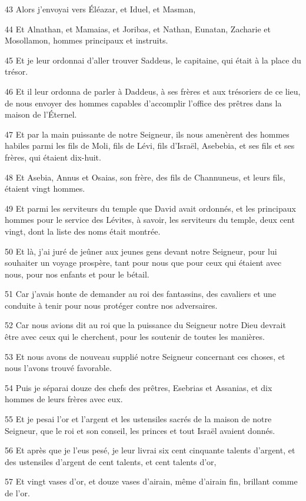 \par 43 Alors j'envoyai vers Éléazar, et Iduel, et Masman,
\par 44 Et Alnathan, et Mamaias, et Joribas, et Nathan, Eunatan, Zacharie et Mosollamon, hommes principaux et instruits.
\par 45 Et je leur ordonnai d'aller trouver Saddeus, le capitaine, qui était à la place du trésor.
\par 46 Et il leur ordonna de parler à Daddeus, à ses frères et aux trésoriers de ce lieu, de nous envoyer des hommes capables d'accomplir l'office des prêtres dans la maison de l'Éternel.
\par 47 Et par la main puissante de notre Seigneur, ils nous amenèrent des hommes habiles parmi les fils de Moli, fils de Lévi, fils d'Israël, Asebebia, et ses fils et ses frères, qui étaient dix-huit.
\par 48 Et Asebia, Annus et Osaias, son frère, des fils de Channuneus, et leurs fils, étaient vingt hommes.
\par 49 Et parmi les serviteurs du temple que David avait ordonnés, et les principaux hommes pour le service des Lévites, à savoir, les serviteurs du temple, deux cent vingt, dont la liste des noms était montrée.
\par 50 Et là, j'ai juré de jeûner aux jeunes gens devant notre Seigneur, pour lui souhaiter un voyage prospère, tant pour nous que pour ceux qui étaient avec nous, pour nos enfants et pour le bétail.
\par 51 Car j'avais honte de demander au roi des fantassins, des cavaliers et une conduite à tenir pour nous protéger contre nos adversaires.
\par 52 Car nous avions dit au roi que la puissance du Seigneur notre Dieu devrait être avec ceux qui le cherchent, pour les soutenir de toutes les manières.
\par 53 Et nous avons de nouveau supplié notre Seigneur concernant ces choses, et nous l'avons trouvé favorable.
\par 54 Puis je séparai douze des chefs des prêtres, Esebrias et Assanias, et dix hommes de leurs frères avec eux.
\par 55 Et je pesai l'or et l'argent et les ustensiles sacrés de la maison de notre Seigneur, que le roi et son conseil, les princes et tout Israël avaient donnés.
\par 56 Et après que je l'eus pesé, je leur livrai six cent cinquante talents d'argent, et des ustensiles d'argent de cent talents, et cent talents d'or,
\par 57 Et vingt vases d'or, et douze vases d'airain, même d'airain fin, brillant comme de l'or.
